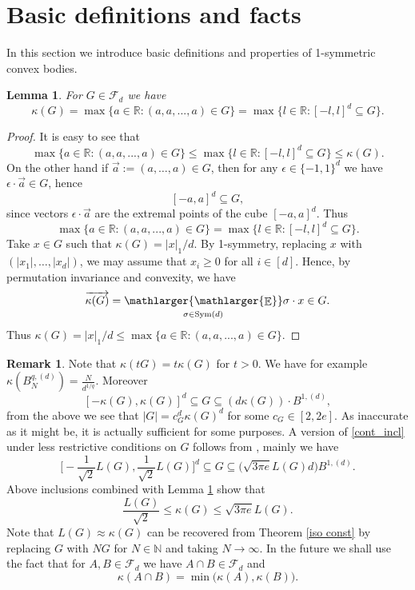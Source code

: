 \documentclass[a4paper,oneside, reqno]{amsart}
\numberwithin{equation}{section}
\newtheorem{Lem}[Thm]{Lemma}
\theoremstyle{definition}%
\newtheorem{Rem}[Thm]{Remark}
\theoremstyle{definition}
\theoremstyle{definition}%
\theoremstyle{definition}
\newcommand{\E}{\mathop{\mathbb{E}}}
\newcommand{\R}{\mathbb{R}}
\newcommand{\N}{\mathbb{N}}
\DeclareMathOperator{\Sym}{Sym}
\newcommand{\se}[1]{\underset{_{\substack{#1}}}{\mathlarger{\mathlarger{\E}}}}
\begin{document}




\section{Basic definitions and facts}
In this section we introduce basic definitions and properties of 1-symmetric convex bodies.
\begin{Lem} \label{lem:kappa_def}
    For $G \in \mathcal{F}_d$ we have
    \[
    \kappa(G)= \max\Big\{a \in \R : (a,a,...,a) \in G \Big\}=\max\Big\{l \in \R : [-l,l]^d \subseteq G \Big\}.
    \]
\end{Lem}
\begin{proof}
It is easy to see that 
\[
\max\Big\{a \in \R : (a,a,...,a) \in G \Big\} \le \max\Big\{l \in \R : [-l,l]^d \subseteq G \Big\} \le \kappa(G).
\]
On the other hand if $\overrightarrow{a}:=(a, \ldots ,a) \in G$, then for any $\epsilon \in \{-1,1\}^d$ we have $\epsilon \cdot \overrightarrow{a} \in G $, hence 
\[
[-a,a]^d \subseteq G,
\]
since vectors $\epsilon \cdot \overrightarrow{a}$ are the extremal points of the cube $[-a,a]^d$. Thus 
\[
\max\Big\{a \in \R : (a,a,...,a) \in G \Big\} = \max\Big\{l \in \R : [-l,l]^d \subseteq G \Big\}.
\]
Take $x \in G$ such that $\kappa(G)= |x|_1/d$. By 1-symmetry, replacing $x$ with $(|x_1|, \ldots, |x_d|)$, we may assume that $x_i \ge 0$ for all $i \in [d]$. Hence, by permutation invariance and convexity, we have
\[
\overrightarrow{\kappa(G)}= \se{\sigma \in \Sym(d)} \sigma \cdot x \in G.
\]
Thus $\kappa(G)= |x|_1/d \le \max\Big\{a \in \R : (a,a,...,a) \in G \Big\}$.
\end{proof}
\begin{Rem}
 Note that $\kappa(tG)=t\kappa(G)$ for $t>0$.
We have for example $\kappa(B_N^{q,(d)})= \frac{N}{d^{1/q}}.$ Moreover
\begin{equation} \label{cont_incl}
   [-\kappa(G),\kappa(G)]^d \subseteq G \subseteq (d \kappa(G) ) \cdot B^{1,(d)},
\end{equation}
from the above we see that $|G| = c_G^d \kappa(G)^d$ for some $c_G \in [2,2e]$. As inaccurate as it might be, it is actually sufficient for some purposes.
A version of \eqref{cont_incl} under less restrictive conditions on $G$ follows from \cite[Propositions 2.4, 2.5 and (2.2)]{bob-naz}, mainly we have 
\[
\Big[- \frac{1}{\sqrt{2}}L(G),\frac{1}{\sqrt{2}}L(G)\Big]^d \subseteq G \subseteq \big(\sqrt{3 \pi e}   L(G) d\big) B^{1,(d)}.
\]
Above inclusions combined with Lemma \ref{lem:kappa_def} show that
\begin{equation} \label{comparability of LG and kappaG}
    \frac{L(G)}{\sqrt{2}} \le \kappa(G) \le \sqrt{3 \pi e} L(G).
\end{equation}
Note that $L(G) \approx \kappa(G)$ can be recovered from Theorem \ref{iso const} by replacing $G$ with $NG$ for $N \in \N$ and taking $N \to \infty$.
In the future we shall use the fact that for $A,B \in \mathcal{F}_d$ we have $A \cap B \in \mathcal{F}_d$ and
\[
\kappa(A \cap B) = \min\big( \kappa(A), \kappa(B) \big).
\]
\end{Rem}
\end{document}
